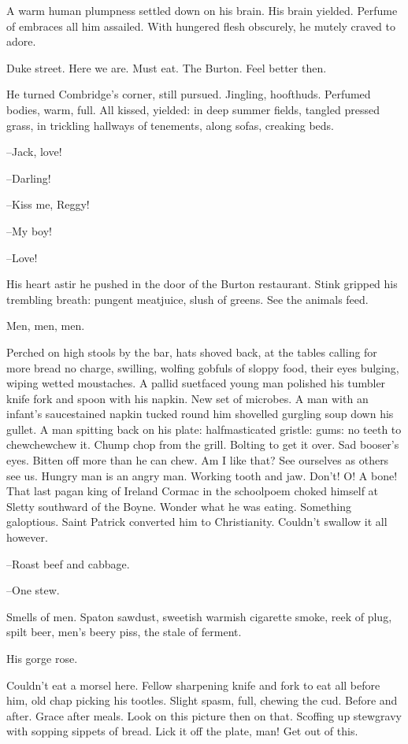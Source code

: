 A warm human plumpness settled down on his brain.
His brain
yielded.
Perfume of embraces all him assailed.
With hungered flesh
obscurely,
he mutely craved to adore.

Duke street.
Here we are.
Must eat.
The Burton.
Feel better then.

He turned Combridge's corner,
still pursued.
Jingling,
hoofthuds.
Perfumed bodies,
warm,
full.
All kissed,
yielded:
in deep summer fields,
tangled pressed grass,
in trickling hallways of tenements,
along sofas,
creaking beds.

--Jack,
love!

--Darling!

--Kiss me,
Reggy!

--My boy!

--Love!

His heart astir he pushed in the door of the Burton restaurant.
Stink
gripped his trembling breath:
pungent meatjuice,
slush of greens.
See the
animals feed.

Men,
men,
men.

Perched on high stools by the bar,
hats shoved back,
at the tables
calling for more bread no charge,
swilling,
wolfing gobfuls of sloppy
food,
their eyes bulging,
wiping wetted moustaches.
A pallid suetfaced
young man polished his tumbler knife fork and spoon with his napkin.
New
set of microbes.
A man with an infant's saucestained napkin tucked round
him shovelled gurgling soup down his gullet.
A man spitting back on his
plate:
halfmasticated gristle:
gums:
no teeth to chewchewchew it.
Chump
chop from the grill.
Bolting to get it over.
Sad booser's eyes.
Bitten off
more than he can chew.
Am I like that?
See ourselves as others see us.
Hungry man is an angry man.
Working tooth and jaw.
Don't!
O!
A bone!
That
last pagan king of Ireland Cormac in the schoolpoem choked himself at
Sletty southward of the Boyne.
Wonder what he was eating.
Something
galoptious.
Saint Patrick converted him to Christianity.
Couldn't swallow
it all however.

--Roast beef and cabbage.

--One stew.

Smells of men.
Spaton sawdust,
sweetish warmish cigarette smoke,
reek of
plug,
spilt beer,
men's beery piss,
the stale of ferment.

His gorge rose.

Couldn't eat a morsel here.
Fellow sharpening knife and fork to eat
all before him,
old chap picking his tootles.
Slight spasm,
full,
chewing
the cud.
Before and after.
Grace after meals.
Look on this picture then on
that.
Scoffing up stewgravy with sopping sippets of bread.
Lick it off the
plate,
man!
Get out of this.

